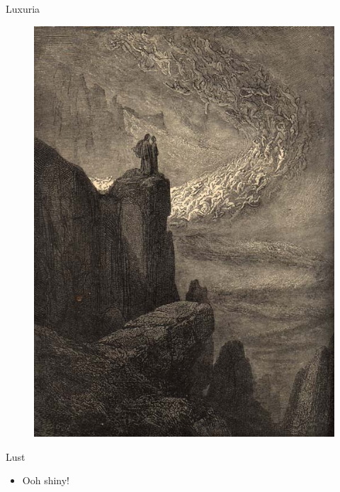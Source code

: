 \documentclass[12pt,xcolor=x11names]{beamer}
\begin{document}
\begin{frame}{Luxuria}
    \begin{figure}
        \centering \includegraphics[height=0.75\textheight]{images/lust.jpg}
    \end{figure}
\end{frame}
\begin{frame}{Lust}
    \begin{itemize}
        \item Ooh shiny!
    \end{itemize}
\end{frame}
\end{document}
